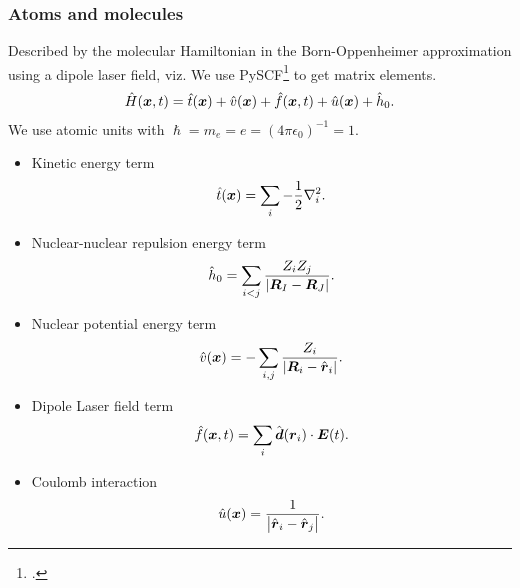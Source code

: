 \documentclass{beamer}
\begin{document}
\begin{frame}
    \frametitle{Atoms and molecules}
    Described by the molecular Hamiltonian in the Born-Oppenheimer approximation
    using a dipole laser field, viz.
    We use PySCF\footcite{pyscf} to get matrix elements.
    \begin{align}
        \hat{H}(\boldsymbol{x}, t)
        = \hat{t}(\boldsymbol{x})
        + \hat{v}(\boldsymbol{x})
        + \hat{f}(\boldsymbol{x}, t)
        + \hat{u}(\boldsymbol{x})
        + \hat{h}_0.
    \end{align}
    We use atomic units with $\hslash = m_e = e = (4\pi\epsilon_0)^{-1} = 1$.
    \begin{itemize}
        \item Kinetic energy term
            \begin{align}
                \hat{t}(\boldsymbol{x})
                = \sum_{i}-\frac{1}{2}\nabla^{2}_i.
            \end{align}
        \item Nuclear-nuclear repulsion energy term
            \begin{align}
                \hat{h}_0
                = \sum_{i < j}\frac{Z_i Z_j}{\abs{\boldsymbol{R}_I - \boldsymbol{R}_J}}.
            \end{align}
    \end{itemize}
\end{frame}

\begin{frame}
    \begin{itemize}
        \item Nuclear potential energy term
            \begin{align}
                \hat{v}(\boldsymbol{x})
                = - \sum_{i, j}\frac{Z_i}{\abs{\boldsymbol{R}_i - \hat{\boldsymbol{r}}_i}}.
            \end{align}
        \item Dipole Laser field term
            \begin{align}
                \hat{f}(\boldsymbol{x}, t)
                = \sum_{i} \hat{\boldsymbol{d}}(\boldsymbol{r}_i)\cdot\boldsymbol{E}(t).
            \end{align}
        \item Coulomb interaction
            \begin{align}
                \hat{u}(\boldsymbol{x})
                = \frac{1}{\abs{\hat{\boldsymbol{r}}_i - \hat{\boldsymbol{r}}_j}}.
            \end{align}
    \end{itemize}
\end{frame}
\end{document}
